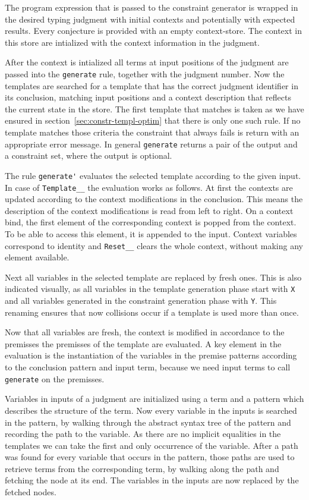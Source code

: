 The program expression that is passed to the constraint generator is
wrapped in the desired typing judgment with initial contexts and
potentially with expected results. Every conjecture is provided with
an empty context-store. The context in this store are intialized with
the context information in the judgment.

After the context is intialized all terms at input positions of the
judgment are passed into the \verb|generate| rule, together with the
judgment number. Now the templates are searched for a template that has the
correct judgment identifier in its conclusion, matching input
positions and a context description that reflects the current state in
the store. The first template that matches is taken as we have ensured
in section~\ref{sec:constr-templ-optim} that there is only one such
rule. If no template matches those criteria the constraint that always
fails is return with an appropriate error message. In general
\verb|generate| returns a pair of the output and a constraint set,
where the output is optional. 

The rule \verb|generate'| evaluates the selected template according to
the given input. In case of \verb|Template__| the evaluation works as
follows. At first the contexts are updated according to the context
modifications in the conclusion. This means the description of the
context modifications is read from left to right. On a context bind,
the first element of the corresponding context is popped from the
context. To be able to access this element, it is appended to the
input. Context variables correspond to identity and \verb|Reset__|
clears the whole context, without making any element available.

Next all variables in the selected template are replaced by fresh
ones. This is also indicated visually, as all variables in the
template generation phase start with \verb|X| and all variables
generated in the constraint generation phase with \verb|Y|. This
renaming ensures that now collisions occur if a template is used more
than once.

Now that all variables are fresh, the context is modified in
accordance to the premisses the premisses of the template are
evaluated. A key element in the evaluation is the instantiation of the
variables in the premise patterns according to the conclusion pattern
and input term, because we need input terms to call \verb|generate| on
the premisses.

Variables in inputs of a judgment are initialized using a term and a
pattern which describes the structure of the term. Now every variable
in the inputs is searched in the pattern, by walking through the
abstract syntax tree of the pattern and recording the path to the
variable. As there are no implicit equalities in the templates we can
take the first and only occurrence of the variable. After a path was
found for every variable that occurs in the pattern, those paths are
used to retrieve terms from the corresponding term, by walking along
the path and fetching the node at its end. The variables in the inputs
are now replaced by the fetched nodes.

